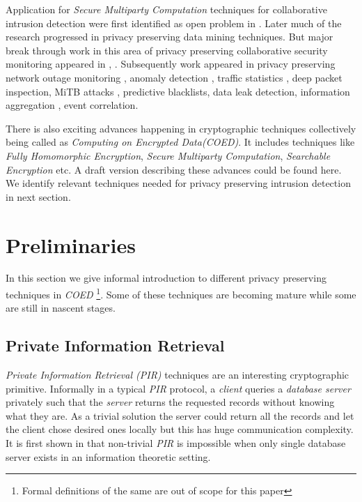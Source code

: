 \documentclass[runningheads,a4paper]{llncs}
\begin{document}
Application for \emph{Secure Multiparty Computation} techniques for collaborative intrusion detection were first identified as open problem in \cite{du2001secure}. Later much of the research progressed in privacy preserving data mining techniques\cite{fung2010privacy}. But major break through work in this area of privacy preserving collaborative security monitoring appeared in \cite{burkhart2010sepia}, \cite{burkhart2011privacy}. Subsequently work appeared in privacy preserving network outage monitoring \cite{djatmiko2013collaborative}, anomaly detection \cite{zhang2012privacy}, traffic statistics \cite{brown2013haze}, deep packet inspection\cite{sherryblindbox}, MiTB attacks \cite{qusa2013secure}, predictive blacklists\cite{melis2015building}\cite{freudiger2015controlled}, data leak detection\cite{shu2013data}, information aggregation \cite{kreitz2012practical}, event correlation\cite{qusa2012privacy}. 

There is also exciting advances happening in cryptographic techniques collectively being called as \emph{Computing on Encrypted Data(COED)}. It includes techniques like \emph{Fully Homomorphic Encryption}, \emph{Secure Multiparty Computation}, \emph{Searchable Encryption} etc. A draft version describing these advances could be found here\cite{coed}. We identify relevant techniques needed for privacy preserving intrusion detection in next section.
\section{Preliminaries}\label{section:pri}
In this section we give informal introduction to different privacy preserving techniques in \emph{COED} \footnote{Formal definitions of the same are out of scope for this paper}. Some of these techniques are becoming mature while some are still in nascent stages.
\subsection{Private Information Retrieval}
\emph{Private Information Retrieval (PIR)} techniques are an interesting cryptographic primitive. Informally in a typical \emph{PIR} protocol, a \emph{client} queries a \emph{database server} privately such that the \emph{server} returns the requested records without knowing what they are. As a trivial solution the server could return all the records and let the client chose desired ones locally but this has huge communication complexity. It is first shown in \cite{chor1998private} that non-trivial  \emph{PIR} is impossible when only single database server exists in an information theoretic setting.
\end{document}
